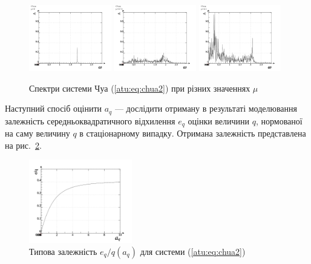 \begin{figure}[htb!]
\centerline{
  \includegraphics[width=0.32\textwidth]{p/cha/chua/chua_f-p_f_mu=2x00.png}
  \includegraphics[width=0.32\textwidth]{p/cha/chua/chua_f-p_f_mu=2x74.png}
  \includegraphics[width=0.32\textwidth]{p/cha/chua/chua_f-p_f_mu=4x50.png}
}
\caption{Спектри системи Чуа (\ref{atu:eq:chua2}) при різних значеннях $ \mu $}
\label{atu:f:chua_spectrum}
\end{figure}

Наступний спосіб оцінити
$ a_q $ --- дослідити отриману в результаті моделювання залежність
середньоквадратичного відхилення
$ e_q $ оцінки величини
$ q $, нормованої на саму величину
$ q $ в стаціонарному випадку. Отримана залежність представлена
на рис.~\ref{atu:f:chua_tau}.

\begin{figure}[htb!]
\centerline{
  \includegraphics[width=0.4\textwidth]{p/cha/chua/chua_tau-p_e_a.png}
}
\caption{Типова залежність $ e_q / q (a_q) $ для системи (\ref{atu:eq:chua2})}
\label{atu:f:chua_tau}
\end{figure}

